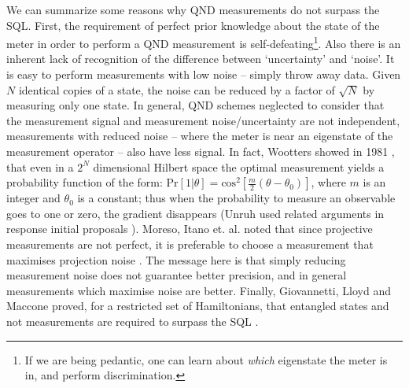 \documentclass[reqno]{amsart}
\def\func#1#2{\mathrm{#1}\left[#2\right]}
\begin{document}
We can summarize some reasons why QND measurements do not surpass the SQL. First, the requirement of perfect prior knowledge about the state of the meter in order to perform a QND measurement is self-defeating\footnote{If we are being pedantic, one can learn about \emph{which} eigenstate the meter is in, and perform discrimination.}. Also there is an inherent lack of recognition of the difference between `uncertainty' and `noise'. It is easy to perform measurements with low noise -- simply throw away data. Given $N$ identical copies of a state, the noise can be reduced by a factor of $\sqrt{N}$ by measuring only one state. In general, QND schemes neglected to consider that the measurement signal and measurement noise/uncertainty are not independent, measurements with reduced noise -- where the meter is near an eigenstate of the measurement operator -- also have less signal. In fact, Wootters showed in 1981 \cite{Wootters1981}, that even in a $2^N$ dimensional Hilbert space the optimal measurement yields a probability function of the form: $\func{Pr}{1|\theta} = \func{cos^2}{\frac{m}{2}(\theta - \theta_0)}$, where $m$ is an integer and $\theta_0$ is a constant; thus when the probability to measure an observable goes to one or zero, the gradient disappears (Unruh used related arguments in response initial proposals \cite{Unruh1978}). Moreso, Itano et. al. noted that since projective measurements are not perfect, it is preferable to choose a measurement that maximises projection noise \cite{Itano1993}. The message here is that simply reducing measurement noise does not guarantee better precision, and in general measurements which maximise noise are better. Finally, Giovannetti, Lloyd and Maccone proved, for a restricted set of Hamiltonians, that entangled states and not measurements are required to surpass the SQL \cite{Giovannetti2006}.
\end{document}
